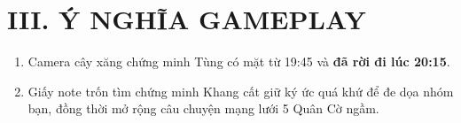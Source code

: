 \documentclass[12pt,a4paper]{article}
\begin{document}
\section*{III. Ý NGHĨA GAMEPLAY}
\begin{enumerate}
    \item Camera cây xăng chứng minh Tùng có mặt từ 19:45 và \textbf{đã rời đi lúc 20:15}.
    \item Giấy note trốn tìm chứng minh Khang cất giữ ký ức quá khứ để đe dọa nhóm bạn, đồng thời mở rộng câu chuyện mạng lưới 5 Quân Cờ ngầm.
\end{enumerate}
\end{document}
